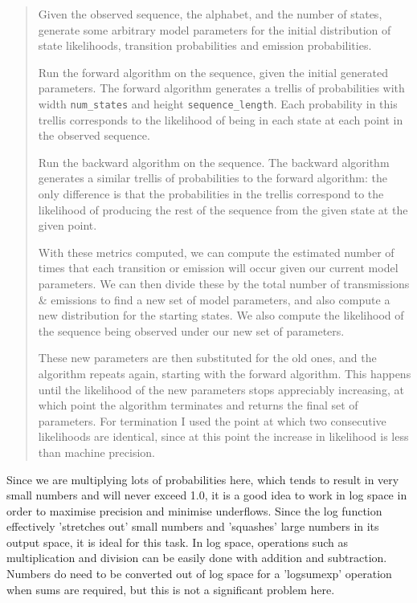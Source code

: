 \documentclass[11pt]{article} %
\begin{document}
\begin{quote}
	Given the observed sequence, the alphabet, and the number of states, generate some arbitrary model parameters for the initial distribution of state likelihoods, transition probabilities and emission probabilities.
	
	Run the forward algorithm on the sequence, given the initial generated parameters. The forward algorithm generates a trellis of probabilities with width \texttt{num\_states} and height \texttt{sequence\_length}. Each probability in this trellis corresponds to the likelihood of being in each state at each point in the observed sequence.
	
	Run the backward algorithm on the sequence. The backward algorithm generates a similar trellis of probabilities to the forward algorithm: the only difference is that the probabilities in the trellis correspond to the likelihood of producing the rest of the sequence from the given state at the given point.
	
	With these metrics computed, we can compute the estimated number of times that each transition or emission will occur given our current model parameters. We can then divide these by the total number of transmissions \& emissions to find a new set of model parameters, and also compute a new distribution for the starting states. We also compute the likelihood of the sequence being observed under our new set of parameters.
	
	These new parameters are then substituted for the old ones, and the algorithm repeats again, starting with the forward algorithm. This happens until the likelihood of the new parameters stops appreciably increasing, at which point the algorithm terminates and returns the final set of parameters. For termination I used the point at which two consecutive likelihoods are identical, since at this point the increase in likelihood is less than machine precision.
\end{quote}

Since we are multiplying lots of probabilities here, which tends to result in very small numbers and will never exceed 1.0, it is a good idea to work in log space in order to maximise precision and minimise underflows. Since the log function effectively 'stretches out' small numbers and 'squashes' large numbers in its output space, it is ideal for this task. In log space, operations such as multiplication and division can be easily done with addition and subtraction. Numbers do need to be converted out of log space for a 'logsumexp' operation when sums are required, but this is not a significant problem here.
\end{document}
